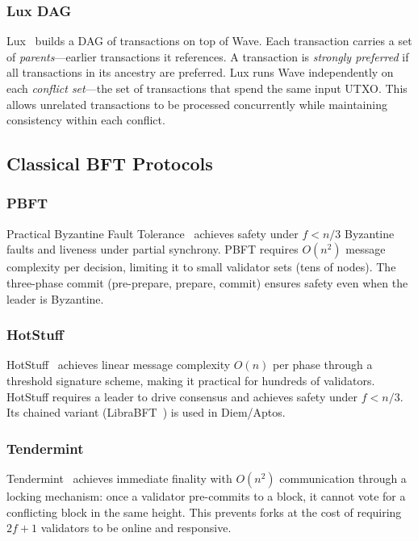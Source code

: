 \subsubsection{Lux DAG}
Lux~\cite{rocket2019wave} builds a DAG of transactions on top of Wave. Each
transaction carries a set of \emph{parents}---earlier transactions it references. A
transaction is \emph{strongly preferred} if all transactions in its ancestry are preferred.
Lux runs Wave independently on each \emph{conflict set}---the set of transactions
that spend the same input UTXO. This allows unrelated transactions to be processed
concurrently while maintaining consistency within each conflict.

\subsection{Classical BFT Protocols}

\subsubsection{PBFT}
Practical Byzantine Fault Tolerance~\cite{castro1999practical} achieves safety under
$f < n/3$ Byzantine faults and liveness under partial synchrony. PBFT requires
$O(n^2)$ message complexity per decision, limiting it to small validator sets (tens of
nodes). The three-phase commit (pre-prepare, prepare, commit) ensures safety even when the
leader is Byzantine.

\subsubsection{HotStuff}
HotStuff~\cite{yin2019hotstuff} achieves linear message complexity $O(n)$ per phase through
a threshold signature scheme, making it practical for hundreds of validators. HotStuff
requires a leader to drive consensus and achieves safety under $f < n/3$. Its chained
variant (LibraBFT~\cite{baudet2019state}) is used in Diem/Aptos.

\subsubsection{Tendermint}
Tendermint~\cite{buchman2016tendermint} achieves immediate finality with $O(n^2)$
communication through a locking mechanism: once a validator pre-commits to a block, it
cannot vote for a conflicting block in the same height. This prevents forks at the cost of
requiring $2f+1$ validators to be online and responsive.

